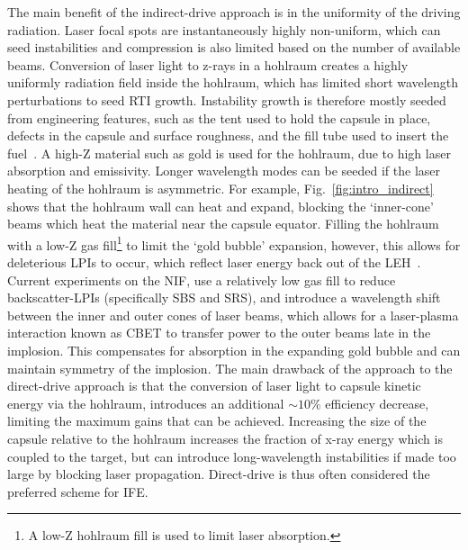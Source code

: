 The main benefit of the indirect-drive approach is in the uniformity of the driving radiation.
Laser focal spots are instantaneously highly non-uniform, which can seed instabilities and compression is also limited based on the number of available beams.
Conversion of laser light to z-rays in a hohlraum creates a highly uniformly radiation field inside the hohlraum, which has limited short wavelength perturbations to seed \ac{RTI} growth.
Instability growth is therefore mostly seeded from engineering features, such as the tent used to hold the capsule in place, defects in the capsule and surface roughness, and the fill tube used to insert the fuel~\cite{clark_threedimensional_2016}.
A high-Z material such as gold is used for the hohlraum, due to high laser absorption and emissivity.
Longer wavelength modes can be seeded if the laser heating of the hohlraum is asymmetric.
For example, Fig.~\ref{fig:intro_indirect} shows that the hohlraum wall can heat and expand, blocking the `inner-cone' beams which heat the material near the capsule equator.
Filling the hohlraum with a low-Z gas fill\footnote{A low-Z hohlraum fill is used to limit laser absorption.} to limit the `gold bubble' expansion, however, this allows for deleterious \ac{LPIs} to occur, which reflect laser energy back out of the \ac{LEH}~\cite{macgowan_laser_1996}.
Current experiments on the \ac{NIF}, use a relatively low gas fill to reduce backscatter-\ac{LPIs} (specifically \ac{SBS} and \ac{SRS}), and introduce a wavelength shift between the inner and outer cones of laser beams, which allows for a laser-plasma interaction known as \ac{CBET} to transfer power to the outer beams late in the implosion\cite{michel_tuning_2009,moody_multistep_2012,kritcher_energy_2018}.
This compensates for absorption in the expanding gold bubble and can maintain symmetry of the implosion.
The main drawback of the approach to the direct-drive approach is that the conversion of laser light to capsule kinetic energy via the hohlraum, introduces an additional $\sim10\%$ efficiency decrease, limiting the maximum gains that can be achieved.
Increasing the size of the capsule relative to the hohlraum increases the fraction of x-ray energy which is coupled to the target, but can introduce long-wavelength instabilities if made too large by blocking laser propagation.
Direct-drive is thus often considered the preferred scheme for \ac{IFE}.

